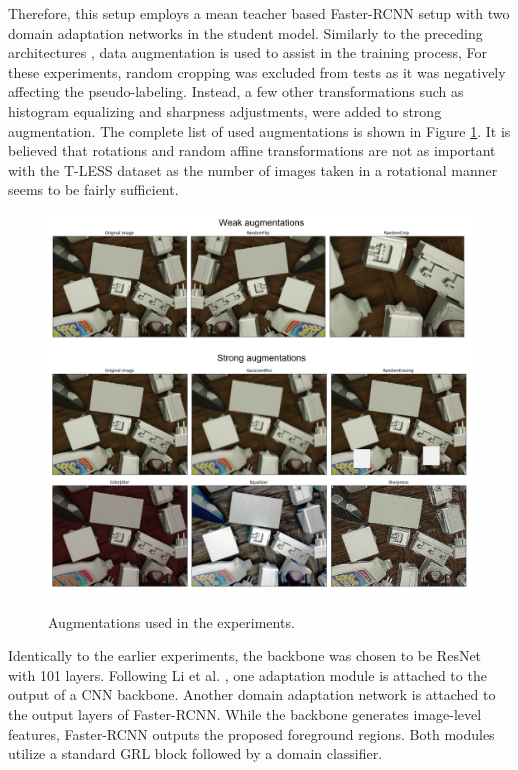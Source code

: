 Therefore, this setup employs a mean teacher based Faster-RCNN \cite{ima} setup with two domain adaptation networks in the student model. Similarly to the preceding architectures \cite{Li2021,Liu2021}, data augmentation is used to assist in the training process, For these experiments, random cropping was excluded from tests as it was negatively affecting the pseudo-labeling. Instead, a few other transformations such as histogram equalizing and sharpness adjustments, were added to strong augmentation. The complete list of used augmentations is shown in Figure \ref{newAugmentations}. It is believed that rotations and random affine transformations are not as important with the T-LESS dataset as the number of images taken in a rotational manner seems to be fairly sufficient.

\begin{figure}[htb]
	\begin{center}
		\includegraphics[width=16cm]{./Tless_augm.png}
	\end{center}
    \caption{Augmentations used in the experiments.}
	\begin{center}
		\label{newAugmentations}
	\end{center}
\end{figure}
\FloatBarrier

Identically to the earlier experiments, the backbone was chosen to be ResNet \cite{He2015} with 101 layers. Following Li et al. \cite{Li2021}, one adaptation module is attached to the output of a CNN backbone.  Another domain adaptation network is attached to the output layers of Faster-RCNN. While the backbone generates image-level features, Faster-RCNN outputs the proposed foreground regions. Both modules utilize a standard GRL block \cite{Ganin2015} followed by a domain classifier.



